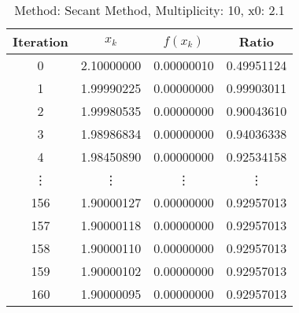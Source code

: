 \begin{table}
\centering
\caption{Method: Secant Method, Multiplicity: 10, x0: 2.1}
\label{tab:table_Secant_Method_10_2_1}
\begin{tabular}{c c c c}
\toprule
Iteration &      $x_k$ &   $f(x_k)$ &      Ratio \\
\midrule
        0 & 2.10000000 & 0.00000010 & 0.49951124 \\
        1 & 1.99990225 & 0.00000000 & 0.99903011 \\
        2 & 1.99980535 & 0.00000000 & 0.90043610 \\
        3 & 1.98986834 & 0.00000000 & 0.94036338 \\
        4 & 1.98450890 & 0.00000000 & 0.92534158 \\
   \vdots &     \vdots &     \vdots &     \vdots \\
      156 & 1.90000127 & 0.00000000 & 0.92957013 \\
      157 & 1.90000118 & 0.00000000 & 0.92957013 \\
      158 & 1.90000110 & 0.00000000 & 0.92957013 \\
      159 & 1.90000102 & 0.00000000 & 0.92957013 \\
      160 & 1.90000095 & 0.00000000 & 0.92957013 \\
\bottomrule
\end{tabular}
\end{table}
